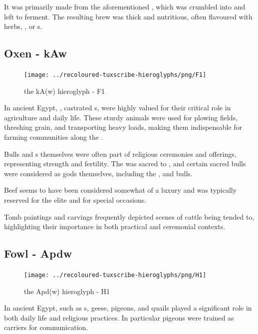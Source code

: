 It was primarily made from the aforementioned , which was crumbled into  and left to ferment. The resulting brew was thick and nutritious, often flavoured with herbs, , or s.

\subsection*{Oxen - kAw}

\begin{figure} [H]
	\centering
	\texttt{[image: ../recoloured-tuxscribe-hieroglyphs/png/F1]}
	\caption{the kA(w) hieroglyph - F1}
\end{figure}

In ancient Egypt, , castrated s, were highly valued for their critical role in agriculture and daily life. These sturdy animals were used for plowing fields, threshing grain, and transporting heavy loads, making them indispensable for farming communities along the .

Bulls and s themselves were often part of religious ceremonies and offerings, representing strength and fertility. The  was sacred to , and certain sacred bulls were considered as gods themselves, including the ,  and  bulls.

Beef seems to have been considered somewhat of a luxury and was typically reserved for the elite and for special occasions.

Tomb paintings and carvings frequently depicted scenes of cattle being tended to, highlighting their importance in both practical and ceremonial contexts.

\subsection*{Fowl - Apdw}

\begin{figure} [H]
	\centering
	\texttt{[image: ../recoloured-tuxscribe-hieroglyphs/png/H1]}
	\caption{the Apd(w) hieroglyph - H1}
\end{figure}

In ancient Egypt,  such as s, geese, pigeons, and quails played a significant role in both daily life and religious practices. In particular pigeons were trained as carriers for communication.

